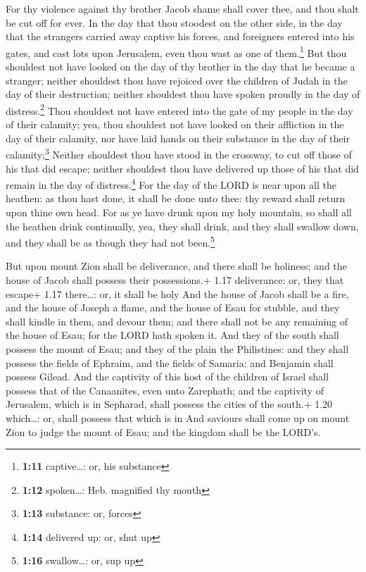  For thy violence against thy brother Jacob shame shall
cover thee, and thou shalt be cut off for ever.  In the
day that thou stoodest on the other side, in the day that the strangers
carried away captive his forces, and foreigners entered into his gates,
and cast lots upon Jerusalem, even thou wast as one of them.\footnote{\textbf{1:11}
  captive\ldots: or, his substance}  But thou shouldest
not have looked on the day of thy brother in the day that he became a
stranger; neither shouldest thou have rejoiced over the children of
Judah in the day of their destruction; neither shouldest thou have
spoken proudly in the day of distress.\footnote{\textbf{1:12}
  spoken\ldots: Heb. magnified thy mouth}  Thou shouldest
not have entered into the gate of my people in the day of their
calamity; yea, thou shouldest not have looked on their affliction in the
day of their calamity, nor have laid hands on their substance in the day
of their calamity;\footnote{\textbf{1:13} substance: or, forces}
 Neither shouldest thou have stood in the crossway, to
cut off those of his that did escape; neither shouldest thou have
delivered up those of his that did remain in the day of
distress.\footnote{\textbf{1:14} delivered up: or, shut up}
 For the day of the LORD is near upon all the heathen: as
thou hast done, it shall be done unto thee: thy reward shall return upon
thine own head.  For as ye have drunk upon my holy
mountain, so shall all the heathen drink continually, yea, they shall
drink, and they shall swallow down, and they shall be as though they had
not been.\footnote{\textbf{1:16} swallow\ldots: or, sup up}

 But upon mount Zion shall be deliverance, and there
shall be holiness; and the house of Jacob shall possess their
possessions.+ 1.17 deliverance: or, they that escape+ 1.17 there\ldots:
or, it shall be holy  And the house of Jacob shall be a
fire, and the house of Joseph a flame, and the house of Esau for
stubble, and they shall kindle in them, and devour them; and there shall
not be any remaining of the house of Esau; for the LORD hath spoken it.
 And they of the south shall possess the mount of Esau;
and they of the plain the Philistines: and they shall possess the fields
of Ephraim, and the fields of Samaria: and Benjamin shall possess
Gilead.  And the captivity of this host of the children
of Israel shall possess that of the Canaanites, even unto Zarephath; and
the captivity of Jerusalem, which is in Sepharad, shall possess the
cities of the south.+ 1.20 which\ldots: or, shall possess that which is
in  And saviours shall come up on mount Zion to judge the
mount of Esau; and the kingdom shall be the LORD's.
